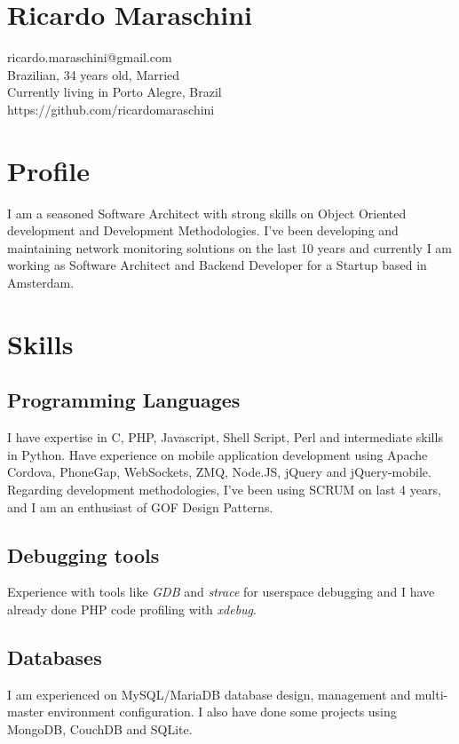 \documentclass{article}
\begin{document}
\begin{multicols}{2}

\section{Ricardo Maraschini}
ricardo.maraschini@gmail.com\\
Brazilian, 34 years old, Married\\
Currently living in Porto Alegre, Brazil\\
https://github.com/ricardomaraschini

\section{Profile}
I am a seasoned Software Architect with strong skills on Object Oriented
development and Development Methodologies. I've been developing and maintaining
network monitoring solutions on the last 10 years and currently I am
working as Software Architect and Backend Developer for a Startup based in
Amsterdam.

\section{Skills}
\subsection{Programming Languages}
I have expertise in C, PHP, Javascript, Shell Script, Perl and intermediate
skills in Python. Have experience on mobile application development using Apache 
Cordova, PhoneGap, WebSockets, ZMQ, Node.JS, jQuery and jQuery-mobile. Regarding
development methodologies, I've been using SCRUM on last 4 years, and I am an 
enthusiast of GOF Design Patterns.

\subsection{Debugging tools}
Experience with tools like \textit{GDB} and \textit{strace} for userspace 
debugging and I have already done PHP code profiling with \textit{xdebug}.

\subsection{Databases}
I am experienced on MySQL/MariaDB database design, management and multi-master
environment configuration. I also have done some projects using MongoDB, CouchDB
and SQLite.


\end{multicols}
\end{document}
